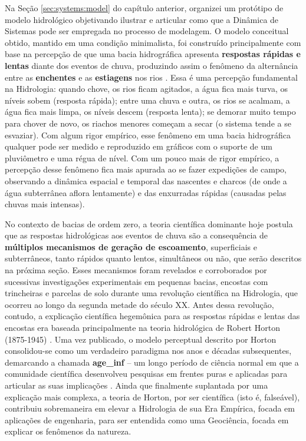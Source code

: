 \documentclass[./main.tex]{subfiles}
\begin{document}
\par Na Seção \ref{sec:systems:model} do capítulo anterior, organizei um protótipo de modelo hidrológico objetivando ilustrar e articular como que a Dinâmica de Sistemas pode ser empregada no processo de modelagem. O modelo conceitual obtido, mantido em uma condição minimalista, foi construído principalmente com base na percepção de que uma bacia hidrográfica apresenta \textbf{respostas rápidas e lentas} diante dos eventos de chuva, produzindo assim o fenômeno da alternância entre as \textbf{enchentes} e as \textbf{estiagens} nos rios \cite{Hewlett1967}. Essa é uma percepção fundamental na Hidrologia: quando chove, os rios ficam agitados, a água fica mais turva, os níveis sobem (resposta rápida); entre uma chuva e outra, os rios se acalmam, a água fica mais limpa, os níveis descem (resposta lenta); se demorar muito tempo para chover de novo, os riachos menores começam a secar (o sistema tende a se esvaziar). Com algum rigor empírico, esse fenômeno em uma bacia hidrográfica qualquer pode ser medido e reproduzido em gráficos com o suporte de um pluviômetro e uma régua de nível. Com um pouco mais de rigor empírico, a percepção desse fenômeno fica mais apurada ao se fazer expedições de campo, observando a dinâmica espacial e temporal das nascentes e charcos (de onde a água subterrânea aflora lentamente) e das enxurradas rápidas (causadas pelas chuvas mais intensas). 

\par No contexto de bacias de ordem zero, a teoria científica dominante hoje postula que as respostas hidrológicas aos eventos de chuva são a consequência de \textbf{múltiplos mecanismos de geração de escoamento}, superficiais e subterrâneos, tanto rápidos quanto lentos, simultâneos ou não, que serão descritos na próxima seção. Esses mecanismos foram revelados e corroborados por sucessivas investigações experimentais em pequenas bacias, encostas com trincheiras e parcelas de solo durante uma revolução científica na Hidrologia, que ocorreu ao longo da segunda metade do século XX. Antes dessa revolução, contudo, a explicação científica hegemônica para as respostas rápidas e lentas das encostas era baseada principalmente na teoria hidrológica de Robert Horton (1875-1945) \cite{Horton1933, Beven2004a}. Uma vez publicado, o modelo perceptual descrito por Horton consolidou-se como um verdadeiro \gls{paradigma} nos anos e décadas subsequentes, demarcando a chamada \textbf{\gls{age_inf}} -- um longo período de ciência normal em que a comunidade científica desenvolveu pesquisas em frentes puras e aplicadas para articular as suas implicações \cite{Cook1946, Beven2021b}. Ainda que finalmente suplantada por uma explicação mais complexa, a teoria de Horton, por ser científica (isto é, falseável), contribuiu sobremaneira em elevar a Hidrologia de sua Era Empírica, focada em aplicações de engenharia, para ser entendida como uma Geociência, focada em explicar os fenômenos da natureza.
\end{document}
